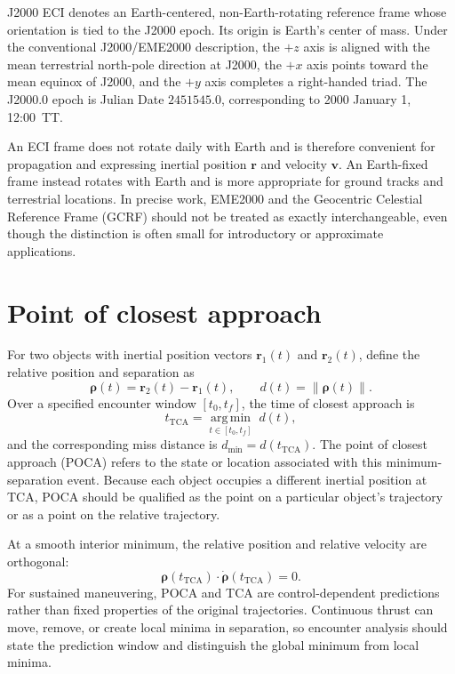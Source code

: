 \documentclass[11pt]{article}
\begin{document}
J2000 ECI denotes an Earth-centered, non-Earth-rotating reference frame whose
orientation is tied to the J2000 epoch. Its origin is Earth's center of mass.
Under the conventional J2000/EME2000 description, the $+z$ axis is aligned with
the mean terrestrial north-pole direction at J2000, the $+x$ axis points toward
the mean equinox of J2000, and the $+y$ axis completes a right-handed triad. The
J2000.0 epoch is Julian Date $2451545.0$, corresponding to 2000 January 1,
12:00~TT.

An ECI frame does not rotate daily with Earth and is therefore convenient for
propagation and expressing inertial position $\boldsymbol r$ and velocity
$\boldsymbol v$. An Earth-fixed frame instead rotates with Earth and is more
appropriate for ground tracks and terrestrial locations. In precise work,
EME2000 and the Geocentric Celestial Reference Frame (GCRF) should not be
treated as exactly interchangeable, even though the distinction is often small
for introductory or approximate applications.

\section{Point of closest approach}

For two objects with inertial position vectors $\boldsymbol r_1(t)$ and
$\boldsymbol r_2(t)$, define the relative position and separation as
\begin{equation}
  \boldsymbol\rho(t)=\boldsymbol r_2(t)-\boldsymbol r_1(t),
  \qquad d(t)=\lVert\boldsymbol\rho(t)\rVert.
\end{equation}
Over a specified encounter window $[t_0,t_f]$, the time of closest approach is
\begin{equation}
  t_{\mathrm{TCA}}=\underset{t\in[t_0,t_f]}{\operatorname{arg\,min}}\;d(t),
\end{equation}
and the corresponding miss distance is $d_{\min}=d(t_{\mathrm{TCA}})$. The point
of closest approach (POCA) refers to the state or location associated with this
minimum-separation event. Because each object occupies a different inertial
position at TCA, POCA should be qualified as the point on a particular object's
trajectory or as a point on the relative trajectory.

At a smooth interior minimum, the relative position and relative velocity are
orthogonal:
\begin{equation}
  \boldsymbol\rho(t_{\mathrm{TCA}})\mathbin{\cdot}
  \dot{\boldsymbol\rho}(t_{\mathrm{TCA}})=0.
\end{equation}
For sustained maneuvering, POCA and TCA are control-dependent predictions rather
than fixed properties of the original trajectories. Continuous thrust can move,
remove, or create local minima in separation, so encounter analysis should state
the prediction window and distinguish the global minimum from local minima.
\end{document}
